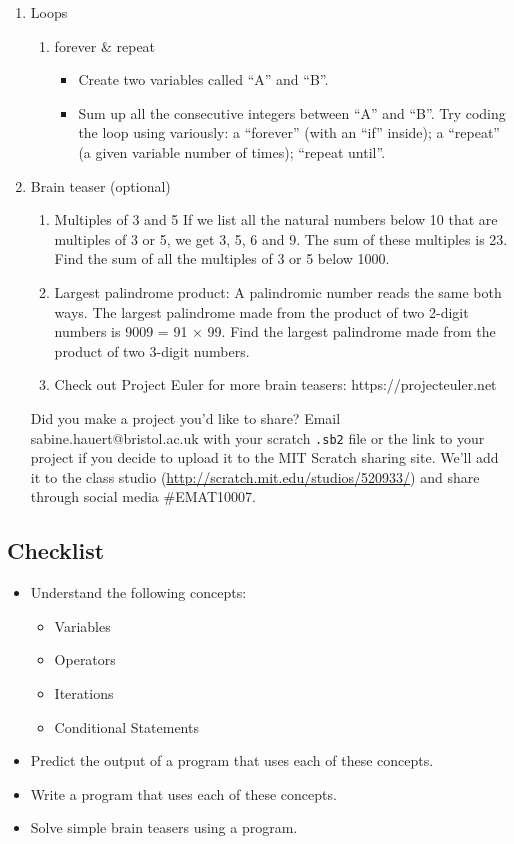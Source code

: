 \documentclass[12pt]{report}
\begin{document}
\begin{enumerate}
\item Loops
\begin{enumerate}
\item forever \& repeat
\begin{itemize}
\item Create two variables called ``A'' and ``B''.
\item Sum up all the consecutive integers between ``A'' and ``B''. Try coding the loop using variously: a ``forever'' (with an ``if'' inside); a ``repeat'' (a given variable number of times); ``repeat until''.
\end{itemize}
\end{enumerate}

\item Brain teaser (optional)

\begin{enumerate}
\item Multiples of 3 and 5
If we list all the natural numbers below 10 that are multiples of 3 or 5, we get 3, 5, 6 and 9. The sum of these multiples is 23. Find the sum of all the multiples of 3 or 5 below 1000.

\item Largest palindrome product:
A palindromic number reads the same both ways. The largest palindrome made from the product of two 2-digit numbers is 9009 = 91 × 99. Find the largest palindrome made from the product of two 3-digit numbers.

\item Check out Project Euler for more brain teasers: https://projecteuler.net
\end{enumerate}

Did you make a project you'd like to share? Email sabine.hauert@bristol.ac.uk with your scratch {\tt .sb2} file or the link to your project if you decide to upload it to the MIT Scratch sharing site. We'll add it to the class studio (\url{http://scratch.mit.edu/studios/520933/}) and share through social media $\#$EMAT10007.
\end{enumerate}

\subsection*{Checklist}
\begin{itemize}
  \item Understand the following concepts:
  		\begin {itemize}
        \item Variables
        \item Operators
        \item Iterations
        \item Conditional Statements
        \end{itemize}
  \item Predict the output of a program that uses each of these concepts.
  \item Write a program that uses each of these concepts.
  \item Solve simple brain teasers using a program.
\end{itemize}
\end{document}
